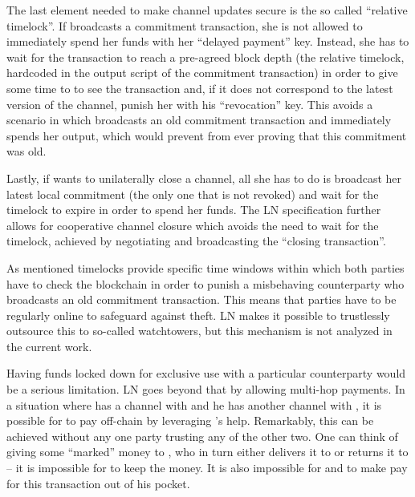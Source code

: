     The last element needed to make channel updates secure is the so called
    ``relative timelock''. If \alice{} broadcasts a commitment transaction, she
    is not allowed to immediately spend her funds with her ``delayed payment''
    key. Instead, she has to wait for the transaction to reach a pre-agreed
    block depth (the relative timelock, hardcoded in the output script of the
    commitment transaction) in order to give some time to \bob{} to see the
    transaction and, if it does not correspond to the latest version of the
    channel, punish her with his ``revocation'' key. This avoids a scenario in
    which \alice{} broadcasts an old commitment transaction and immediately
    spends her output, which would prevent \bob{} from ever proving that this
    commitment was old.

    Lastly, if \alice{} wants to unilaterally close a channel, all she has to do
    is broadcast her latest local commitment (the only one that is not revoked)
    and wait for the timelock to expire in order to spend her funds. The LN
    specification further allows for cooperative channel closure which avoids
    the need to wait for the timelock, achieved by negotiating and broadcasting
    the ``closing transaction''.

    As mentioned timelocks provide specific time windows within which both
    parties have to check the blockchain in order to punish a misbehaving
    counterparty who  broadcasts an old commitment transaction. This means that
    parties have to be regularly online to safeguard against theft. LN makes it
    possible to trustlessly outsource this to so-called watchtowers, but this
    mechanism is not analyzed in the current work.

    Having funds locked down for exclusive use with a particular counterparty
    would be a serious limitation. LN goes beyond that by allowing multi-hop
    payments. In a situation where \alice{} has a channel with \bob{} and he has
    another channel with \charlie{}, it is possible for \alice{} to pay
    \charlie{} off-chain by leveraging \bob's help. Remarkably, this can be
    achieved without any one party trusting any of the other two. One can think
    of \alice{} giving some ``marked'' money to \bob{}, who in turn either
    delivers it to \charlie{} or returns it to \alice{} -- it is impossible for
    \bob{} to keep the money. It is also impossible for \alice{} and \charlie{}
    to make \bob{} pay for this transaction out of his pocket.

